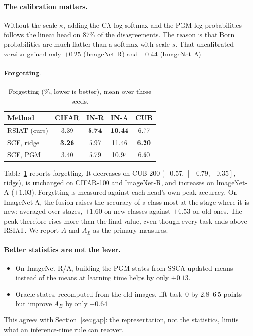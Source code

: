 \paragraph{The calibration matters.}
Without the scale $\kappa$, adding the CA log-softmax and the PGM
log-probabilities follows the linear head on $87\%$ of the disagreements. The
reason is that Born probabilities are much flatter than a softmax with scale
$s$. That uncalibrated version gained only $+0.25$ (ImageNet-R) and $+0.44$
(ImageNet-A).

\paragraph{Forgetting.}
\begin{table}[t]
\centering
\caption{Forgetting (\%, lower is better), mean over three seeds.}
\label{tab:forgetting}
\setlength{\tabcolsep}{5pt}
\scriptsize
\begin{tabular}{lcccc}
\toprule
Method & CIFAR & IN-R & IN-A & CUB \\
\midrule
RSIAT (ours) & 3.39 & \textbf{5.74} & \textbf{10.44} & 6.77 \\
SCF, ridge & \textbf{3.26} & 5.97 & 11.46 & \textbf{6.20} \\
SCF, PGM & 3.40 & 5.79 & 10.94 & 6.60 \\
\bottomrule
\end{tabular}
\end{table}
Table~\ref{tab:forgetting} reports forgetting. It decreases on CUB-200
($-0.57$, $[-0.79,-0.35]$, ridge), is unchanged on CIFAR-100 and
ImageNet-R, and increases on ImageNet-A ($+1.03$). Forgetting is measured
against each head's own peak accuracy. On ImageNet-A, the fusion raises
the accuracy of a class most at the stage where it is new: averaged over
stages, $+1.60$ on new classes against $+0.53$ on old ones. The peak therefore rises more than the
final value, even though every task ends above RSIAT. We report $\bar A$ and
$A_B$ as the primary measures.

\paragraph{Better statistics are not the lever.}
\begin{itemize}
  \item On ImageNet-R/A, building the PGM states from SSCA-updated means
    instead of the means at learning time helps by only $+0.13$.
  \item Oracle states, recomputed from the old images, lift task~0 by
    $2.8$--$6.5$ points but improve $A_B$ by only $+0.64$.
\end{itemize}
This agrees with Section~\ref{sec:gap}: the representation, not the
statistics, limits what an inference-time rule can recover.
